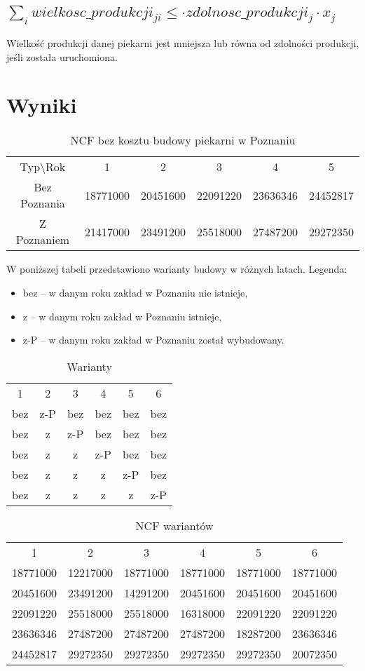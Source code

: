 \documentclass[a4paper]{article}
\begin{document}
\subsection{\(\sum_{i} wielkosc\_produkcji_{ji} \leq \cdot zdolnosc\_produkcji_j \cdot x_j\)}
Wielkość produkcji danej piekarni jest mniejsza lub równa od zdolności produkcji, jeśli została uruchomiona.
\section{Wyniki}
\begin{table}[H]
\centering
\begin{tabular}{cccccc}
Typ\textbackslash Rok & 1 & 2 & 3 & 4 & 5\\
Bez Poznania & 18771000 & 20451600 & 22091220 & 23636346 & 24452817\\
Z Poznaniem & 21417000 & 23491200 & 25518000 & 27487200 & 29272350\\
\end{tabular}
\caption{NCF bez kosztu budowy piekarni w Poznaniu}
\label{tab:ncf}
\end{table}
W poniższej tabeli przedstawiono warianty budowy w różnych latach.
Legenda:
\begin{itemize}
\item bez -- w danym roku zakład w Poznaniu nie istnieje,
\item z -- w danym roku zakład w Poznaniu istnieje,
\item z-P -- w danym roku zakład w Poznaniu został wybudowany.
\end{itemize}
\begin{table}[H]
\centering
\begin{tabular}{cccccc}
1 & 2 & 3 & 4 & 5 & 6\\
bez & z-P & bez & bez & bez & bez\\
bez & z   & z-P & bez & bez & bez\\
bez & z   & z   & z-P & bez & bez\\
bez & z   & z   & z   & z-P & bez\\
bez & z   & z   & z   & z   & z-P\\
\end{tabular}
\caption{Warianty}
\label{tab:warianty}
\end{table}
\begin{table}[H]
\centering
\begin{tabular}{cccccc}
1 & 2 & 3 & 4 & 5 & 6\\
18771000 & 12217000 & 18771000 & 18771000 & 18771000 & 18771000\\
20451600 & 23491200 & 14291200 & 20451600 & 20451600 & 20451600\\
22091220 & 25518000 & 25518000 & 16318000 & 22091220 & 22091220\\
23636346 & 27487200 & 27487200 & 27487200 & 18287200 & 23636346\\
24452817 & 29272350 & 29272350 & 29272350 & 29272350 & 20072350\\
\end{tabular}
\caption{NCF wariantów}
\label{tab:ncf_wariantow}
\end{table}
\end{document}

